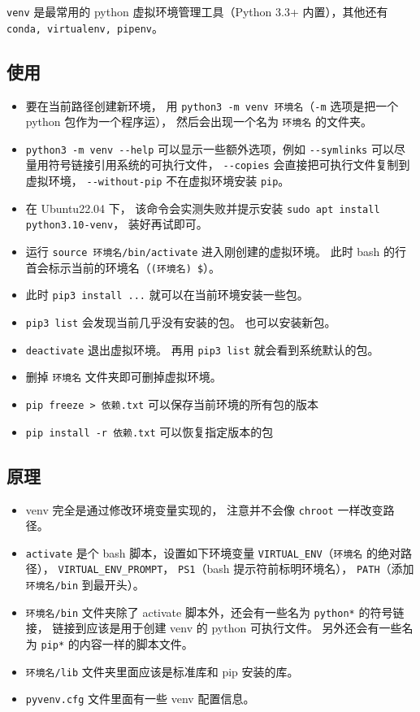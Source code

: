 

\verb`venv` 是最常用的 python 虚拟环境管理工具（Python 3.3+ 内置），其他还有 \verb`conda, virtualenv, pipenv`。

\subsection{使用}
\begin{itemize}
\item 要在当前路径创建新环境， 用 \verb`python3 -m venv 环境名`（\verb`-m` 选项是把一个 python 包作为一个程序运）， 然后会出现一个名为 \verb`环境名` 的文件夹。
\item \verb`python3 -m venv --help` 可以显示一些额外选项，例如 \verb`--symlinks` 可以尽量用符号链接引用系统的可执行文件， \verb`--copies` 会直接把可执行文件复制到虚拟环境， \verb`--without-pip` 不在虚拟环境安装 \verb`pip`。
\item 在 Ubuntu22.04 下， 该命令会实测失败并提示安装 \verb`sudo apt install python3.10-venv`， 装好再试即可。
\item 运行 \verb`source 环境名/bin/activate` 进入刚创建的虚拟环境。 此时 bash 的行首会标示当前的环境名（\verb`(环境名) $`）。
\item 此时 \verb`pip3 install ...` 就可以在当前环境安装一些包。
\item \verb`pip3 list` 会发现当前几乎没有安装的包。 也可以安装新包。
\item \verb`deactivate` 退出虚拟环境。 再用 \verb`pip3 list` 就会看到系统默认的包。
\item 删掉 \verb`环境名` 文件夹即可删掉虚拟环境。
\item \verb`pip freeze > 依赖.txt` 可以保存当前环境的所有包的版本
\item \verb`pip install -r 依赖.txt` 可以恢复指定版本的包
\end{itemize}

\subsection{原理}
\begin{itemize}
\item venv 完全是通过修改环境变量实现的， 注意并不会像 \verb`chroot` 一样改变路径。
\item \verb`activate` 是个 bash 脚本，设置如下环境变量 \verb`VIRTUAL_ENV`（\verb`环境名` 的绝对路径）， \verb`VIRTUAL_ENV_PROMPT`， \verb`PS1`（bash 提示符前标明环境名）， \verb`PATH`（添加 \verb`环境名/bin` 到最开头）。
\item \verb`环境名/bin` 文件夹除了 activate 脚本外，还会有一些名为 \verb`python*` 的符号链接， 链接到应该是用于创建 venv 的 python 可执行文件。 另外还会有一些名为 \verb`pip*` 的内容一样的脚本文件。
\item \verb`环境名/lib` 文件夹里面应该是标准库和 pip 安装的库。
\item \verb`pyvenv.cfg` 文件里面有一些 venv 配置信息。
\end{itemize}


